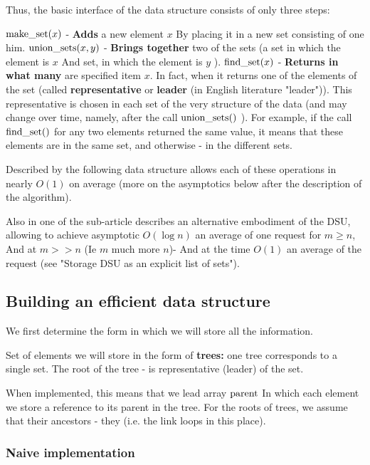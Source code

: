 Thus, the basic interface of the data structure consists of only three steps:

${\rm make \_set} (x)$ - \textbf{Adds} a new element $x$ By placing it in a new set consisting of one him.
${\rm union \_sets} (x, y)$ - \textbf{Brings together} two of the sets (a set in which the element is $x$ And set, in which the element is $y$ ).
${\rm find \_set} (x)$ - \textbf{Returns in what many} are specified item $x$. In fact, when it returns one of the elements of the set (called \textbf{representative} or \textbf{leader} (in English literature "leader")). This representative is chosen in each set of the very structure of the data (and may change over time, namely, after the call ${\rm union \_sets}()$ ).
For example, if the call ${\rm find \_set}()$ for any two elements returned the same value, it means that these elements are in the same set, and otherwise - in the different sets.

Described by the following data structure allows each of these operations in nearly $O (1)$ on average (more on the asymptotics below after the description of the algorithm).

Also in one of the sub-article describes an alternative embodiment of the DSU, allowing to achieve asymptotic $O (\log n)$ an average of one request for $m \ge n$, And at $m >> n$ (Ie $m$ much more $n$)- And at the time $O (1)$ an average of the request (see "Storage DSU as an explicit list of sets").

\subsection{ Building an efficient data structure }

We first determine the form in which we will store all the information.

Set of elements we will store in the form of \textbf{trees:} one tree corresponds to a single set. The root of the tree - is representative (leader) of the set.

When implemented, this means that we lead array ${\rm parent}$ In which each element we store a reference to its parent in the tree. For the roots of trees, we assume that their ancestors - they (i.e. the link loops in this place).

\subsubsection{ Naive implementation }

